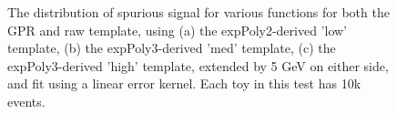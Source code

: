 \begin{figure} 
\begin{center}

\caption{The distribution of spurious signal for various functions for both the GPR and raw template, using (a) the expPoly2-derived 'low' template, (b) the expPoly3-derived 'med' template, (c) the expPoly3-derived 'high' template, extended by 5 GeV on either side, and fit using a linear error kernel. Each toy in this test has 10k events.}
\label{fig:linearkernel_lowpt_10k_noSig}
\end{center}
\end{figure}

